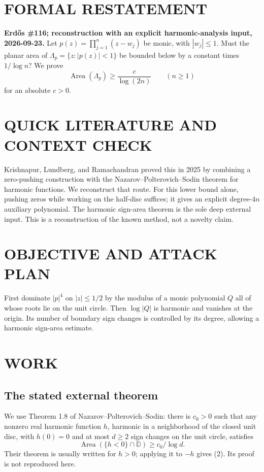 \section{FORMAL RESTATEMENT}
\textbf{Erd\H{o}s \#116; reconstruction with an explicit harmonic-analysis input, 2026-09-23.}
Let $p(z)=\prod_{j=1}^n(z-w_j)$ be monic, with $|w_j|\leq1$. Must the planar area of $\Lambda_p=\{z:|p(z)|<1\}$ be bounded below by a constant times $1/\log n$? We prove
\[
\operatorname{Area}(\Lambda_p)\geq\frac{c}{\log(2n)}\qquad(n\geq1)
\tag{1}
\]
for an absolute $c>0$.

\section{QUICK LITERATURE AND CONTEXT CHECK}
Krishnapur, Lundberg, and Ramachandran proved this in 2025 by combining a zero-pushing construction with the Nazarov--Polterovich--Sodin theorem for harmonic functions. We reconstruct that route. For this lower bound alone, pushing zeros while working on the half-disc suffices; it gives an explicit degree-$4n$ auxiliary polynomial. The harmonic sign-area theorem is the sole deep external input. This is a reconstruction of the known method, not a novelty claim.

\section{OBJECTIVE AND ATTACK PLAN}
First dominate $|p|^4$ on $|z|\leq1/2$ by the modulus of a monic polynomial $Q$ all of whose roots lie on the unit circle. Then $\log|Q|$ is harmonic and vanishes at the origin. Its number of boundary sign changes is controlled by its degree, allowing a harmonic sign-area estimate.

\section{WORK}
\subsection{The stated external theorem}
We use Theorem 1.8 of Nazarov--Polterovich--Sodin: there is $c_0>0$ such that any nonzero real harmonic function $h$, harmonic in a neighborhood of the closed unit disc, with $h(0)=0$ and at most $d\geq2$ sign changes on the unit circle, satisfies
\[
\operatorname{Area}(\{h<0\}\cap\mathbb D)\geq c_0/\log d.
\tag{2}
\]
Their theorem is usually written for $h>0$; applying it to $-h$ gives (2). Its proof is not reproduced here.

